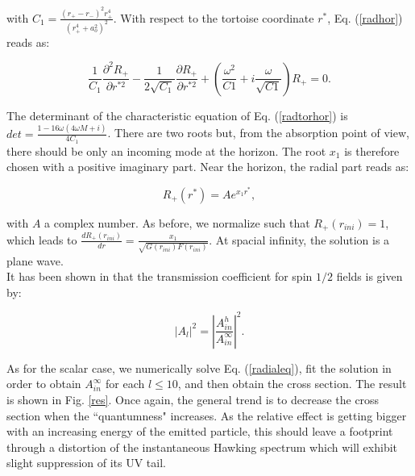 \documentclass[twocolumn,amsmath,amssymb,prl,10pt,nofootinbib,superscriptaddress]{revtex4}
\def\be{\begin{equation}}
\def\ee{\end{equation}}
\begin{document}
 \noindent with $C_1= \frac{(r_+ - r_-)^2  r_+^4 }{(r_+^4 +a_o^2)^2} $. With respect to the tortoise coordinate $r^*$, Eq. (\ref{radhor}) reads as:
 
 \be
\frac{1}{C_1}\frac{\partial ^2 R_+}{\partial r^{* 2}} - \frac{1}{2 \sqrt{C_1}} \frac{\partial R_+}{\partial r^{* 2}} + \left( \frac{\omega ^2}{C1}+ i \frac{\omega}{\sqrt{C1}} \right) R_+ =0.
\label{radtorhor}
 \ee

The determinant of the characteristic equation of Eq. (\ref{radtorhor}) is $det=\frac{1-16 \omega (4 \omega M + i )}{4 C_1}$. There are two roots but, from the absorption point of view, there should be only an incoming mode at the horizon. The root $x_1$ is therefore chosen with a positive imaginary part. Near the horizon, the radial part reads as: 


 \be
 R_+(r^*)= A e^{x_1 r^*},
 \ee

\noindent with $A$ a complex number. As before, we normalize such that  $R_+(r_{ini})=1$, which leads to $\frac{d R_+(r_{ini})}{dr}= \frac{x_1}{\sqrt{G(r_{ini})F(r_{ini})}}$. At spacial infinity, the solution is a plane wave.  \\

It has been shown in \cite{CveticLarsen} that the transmission coefficient for spin $1/2$ fields is given by: 

\be
|A_l |^2= \left| \frac{A^{h}_{in}}{A^{\infty}_{in}} \right| ^2.
\label{coeff}
\ee

As for the scalar case, we numerically solve Eq. (\ref{radialeq}), fit the solution in order to obtain $A^{\infty}_{in}$ for each $l \leq 10$, and then obtain the cross section. The result is shown in Fig. \ref{res}. Once again, the general trend is to decrease the cross section when the ``quantumness" increases. As the relative effect is getting bigger with an increasing energy of the emitted particle, this should leave a footprint through a distortion of the instantaneous Hawking spectrum which will exhibit slight suppression of its UV tail. \\

 
\end{document}
